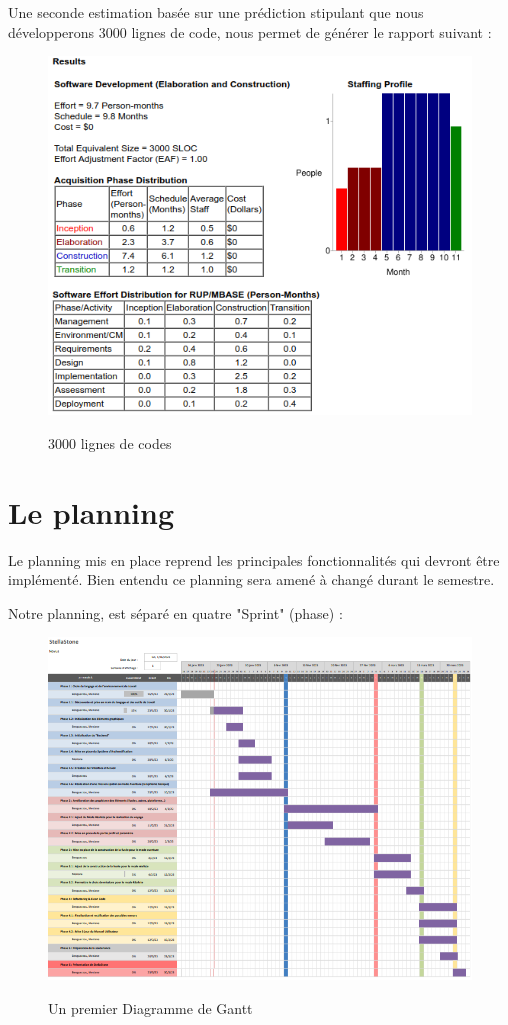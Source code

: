 \documentclass[a4paper, 12pt]{article}
\begin{document}
\newpage

Une seconde estimation basée sur une prédiction stipulant que nous développerons 3000 lignes de code, nous permet de générer le rapport suivant :  
 \begin{figure}[!h]
    \centering
    \includegraphics[scale=0.75]{ccmo2.png}
    \label{fig:Le_planning}
    \caption{3000 lignes de codes}
\end{figure}

\newpage
\section{Le planning}

Le planning mis en place reprend les principales fonctionnalités qui devront être implémenté. Bien entendu ce planning sera amené à changé durant le semestre.

Notre planning, est séparé en quatre "Sprint" (phase) :

 \begin{figure}[!h]
    \centering
    \includegraphics[scale=0.65]{Le planning.png}
    \label{fig:Le_planning}
    \caption{Un premier Diagramme de Gantt}
\end{figure}
\end{document}
